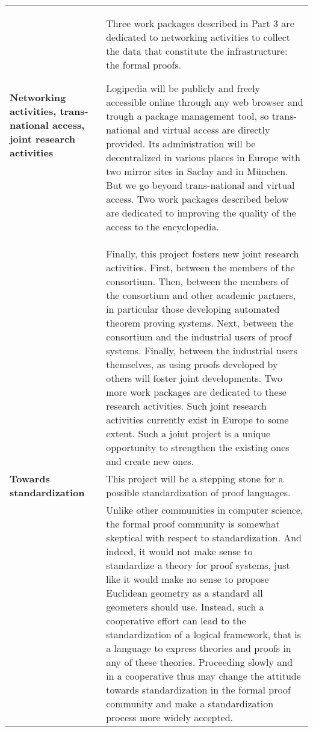 \begin{longtable}{|p{}|p{}|}
{\bf Networking activities, trans-national access, joint research activities}
&
Three work packages described in Part 3
are dedicated to networking activities
to collect the data that constitute the infrastructure: the formal proofs.

\hspace{0.4cm}
Logipedia will be publicly and freely accessible online through any
web browser and trough a package management tool, so trans-national
and virtual access are directly provided. Its administration will be
decentralized in various places in Europe with two mirror sites in
Saclay and in M\"unchen. But we go beyond trans-national and virtual
access.  Two work packages described below are dedicated to improving
the quality of the access to the encyclopedia.\\
&
\hspace{0.4cm}
Finally, this project fosters new joint research activities. First,
between the members of the consortium. Then, between the members of
the consortium and other academic partners, in particular those
developing automated theorem proving systems. Next, between the
consortium and the industrial users of proof systems. Finally, between
the industrial users themselves, as using proofs developed by others
will foster joint developments. Two more work packages are dedicated
to these research activities.  Such joint research activities
currently exist in Europe to some extent.  Such a joint project is a
unique opportunity to strengthen the existing ones and create new
ones.
\\
\hline

{\bf Towards standardization}
&
This project will be a stepping stone for a possible standardization
of proof languages.
\\
&
\hspace{0.4cm}
Unlike other communities in computer science, the formal proof
community is somewhat skeptical with respect to standardization. And
indeed, it would not make sense to standardize a theory for proof
systems, just like it would make no sense to propose Euclidean
geometry as a standard all geometers should use.  Instead, such a
cooperative effort can lead to the standardization of a logical
framework, that is a language to express theories and proofs in any of
these theories. Proceeding slowly and in a cooperative thus may change
the attitude towards standardization in the formal proof community and
make a standardization process more widely accepted.
\\
\hline


\end{longtable}
